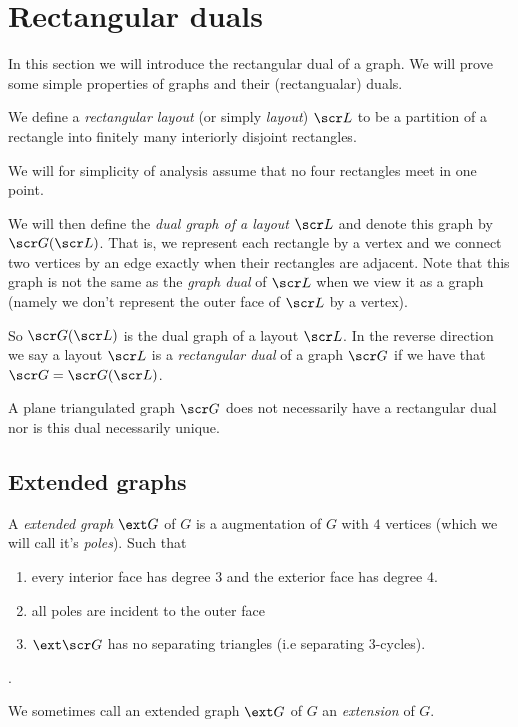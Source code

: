 
\section{Rectangular duals}
\newcommand{\G}{\scr G}
\renewcommand{\L}{\scr L}

In this section we will introduce the rectangular dual of a graph. We will prove some simple properties of graphs and their (rectangualar) duals.

We define a \emph{rectangular layout} (or simply \emph{layout}) $\L$ to be a partition of a rectangle into finitely many interiorly disjoint rectangles.

We will for simplicity of analysis assume that no four rectangles meet in one point. 

We will then define the \emph{dual graph of a layout} $\L$ and denote this graph by $\G(\L)$. That is, we represent each rectangle by a vertex and we connect two vertices by an edge exactly when their rectangles are adjacent. Note that this graph is not the same as the \emph{graph dual} of $\L$ when we view it as a graph (namely we don't represent the outer face of $\L$ by a vertex).

So $\G(\L)$ is the dual graph of a layout $\L$. In the reverse direction we say a layout $\L$ is a \emph{rectangular dual} of a graph $\G$ if we have that $\G = \G (\L)$.

A plane triangulated graph $\G$ does not necessarily have a rectangular dual nor is this dual necessarily unique.


\subsection{Extended graphs}
A \emph{extended graph} $\ext G$ of $G$ is a augmentation of $G$ with $4$  vertices (which we will call it's \emph{poles}). Such that
\begin{enumerate}
\item every interior face has degree $3$ and the exterior face has degree $4$.
\item all poles are incident to the outer face
\item $\ext\G$ has no separating triangles (i.e separating $3$-cycles).
\end{enumerate}.

We sometimes call an extended graph $\ext G$ of $G$ an \emph{extension} of $G$.

